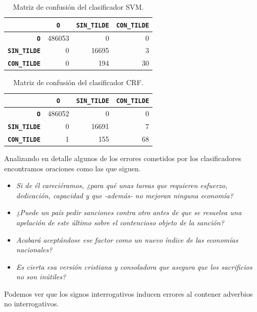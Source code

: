 \documentclass[runningheads,a4paper]{llncs}
\begin{document}
\begin{table}[ht]
 	\renewcommand{\arraystretch}{1.3}
	\renewcommand{\tabcolsep}{3pt}
	\caption{Matriz de confusión del clasificador SVM.}
	\label{table:confusion-svm}
	\centering
	\begin{tabular}{|r||r|r|r|}
		\hline
			& \multicolumn{1}{c|}{\textbf{\texttt{~O~}}}
			& \multicolumn{1}{c|}{\textbf{\texttt{SIN\_TILDE}}}
			& \multicolumn{1}{c|}{\textbf{\texttt{CON\_TILDE}}} \\
		\hline\hline
		\textbf{\texttt{O}}			 & 486053 & 0 & 0 \\ \hline
		\textbf{\texttt{SIN\_TILDE}} & 0 & 16695 & 3 \\ \hline
		\textbf{\texttt{CON\_TILDE}} & 0 & 194 & 30 \\ 
		\hline
	\end{tabular}
\end{table}

\begin{table}[ht]
 	\renewcommand{\arraystretch}{1.3}
	\renewcommand{\tabcolsep}{3pt}
	\caption{Matriz de confusión del clasificador CRF.}
	\label{table:confusion-crf}
	\centering
	\begin{tabular}{|r||r|r|r|}
		\hline
			& \multicolumn{1}{c|}{\textbf{\texttt{~O~}}}
			& \multicolumn{1}{c|}{\textbf{\texttt{SIN\_TILDE}}}
			& \multicolumn{1}{c|}{\textbf{\texttt{CON\_TILDE}}} \\
		\hline\hline
		\textbf{\texttt{O}}			 & 486052 & 0 & 0 \\ \hline
		\textbf{\texttt{SIN\_TILDE}} & 0 & 16691 & 7 \\ \hline
		\textbf{\texttt{CON\_TILDE}} & 1 & 155 & 68 \\ 
		\hline
	\end{tabular}
\end{table}

Analizando en detalle algunos de los errores cometidos por los clasificadores encontramos oraciones como las que siguen.
\begin{itemize}
\item{\emph{Si de él careciéramos, ¿para qué unas tareas que requieren esfuerzo, dedicación, capacidad y que -además- no mejoran ninguna economía?}}
\item{\emph{¿Puede un país pedir sanciones contra otro antes de que se resuelva una apelación de este último sobre el contencioso objeto de la sanción?}}
\item{\emph{Acabará aceptándose ese factor como un nuevo índice de las economías nacionales?}}
\item{\emph{Es cierta esa versión cristiana y consoladora que asegura que los sacrificios no son inútiles?}}
\end{itemize}
Podemos ver que los signos interrogativos inducen errores al contener adverbios no interrogativos.
\end{document}
